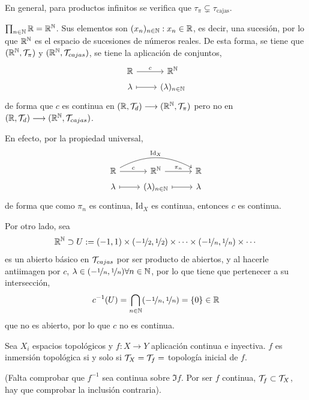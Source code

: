 En general, para productos infinitos se verifica que $\tau_\pi \subsetneq \tau_{\text{cajas}}$.
\begin{custom}
    [Contraejemplo] $\prod_{n \in \mathbb{N}} \mathbb{R} = \mathbb{R}^{\mathbb{N}}$. Sus elementos son $(x_n)_{n \in \mathbb{N}}: x_n \in \mathbb{R}$, es decir, una sucesi\'on, por lo que $\mathbb{R}^{\mathbb{N}}$ es el espacio de sucesiones de n\'umeros reales. De esta forma, se tiene que $(\mathbb{R}^{\mathbb{N}}, \mathcal{T}_{\pi})$ y $(\mathbb{R}^{\mathbb{N}}, \mathcal{T}_{cajas})$, se tiene la aplicaci\'on de conjuntos,
    $$\bt \bb R \rar{c} & \bb R^{\bb N} \\[-5mm] \lambda \rarmaps & (\lambda)_{n\in\bb N}\et$$
     de forma que $c$ es continua en $(\mathbb{R}, \mathcal{T}_d)\longrightarrow (\mathbb{R}^{\mathbb{N}}, \mathcal{T}_{\pi})$ pero no en $(\mathbb{R}, \mathcal{T}_d)\longrightarrow (\mathbb{R}^{\mathbb{N}}, \mathcal{T}_{cajas})$.

     En efecto, por la propiedad universal, 
     $$\bt \bb R \rar{c} \arrow[bend left=10mm]{rr}{\text{Id}_X} & \bb R^{\bb N} \rar{\pi_n} & \bb R \\[-5mm] 
     \lambda \rarmaps & (\lambda)_{n \in \bb N} \rarmaps & \lambda
     \et$$ de forma que como $\pi_n$ es continua, $\text{Id}_X$ es continua, entonces $c$ es continua.

     Por otro lado, sea 
     $$\mathbb{R}^{\mathbb{N}} \supset U := (-1,1) \times (-\nicefrac{1}{2}, \nicefrac{1}{2}) \times \cdots \times (-\nicefrac{1}{n}, \nicefrac{1}{n}) \times \cdots $$
     es un abierto b\'asico en $\mathcal{T}_{cajas}$ por ser producto de abiertos, y al hacerle antiimagen por $c$, $\lambda \in (-\nicefrac{1}{n}, \nicefrac{1}{n})\forall n\in \mathbb{N}$, por lo que tiene que pertenecer a su intersecci\'on,  
     $$c^{-1} (U) = \bigcap_{n \in \mathbb{N}} (-\nicefrac{1}{n}, \nicefrac{1}{n}) = \{0\} \in \mathbb{R}$$
     que no es abierto, por lo que $c$ no es continua.
\end{custom}
\begin{ejer}
    Sea $X_i$ espacios topol\'ogicos y $f:X\longrightarrow Y$ aplicaci\'on continua e inyectiva. $f$ es inmersi\'on topol\'ogica si y solo si $\mathcal{T}_X = \mathcal{T}_f =$ topolog\'ia inicial de $f$. 
    
    (Falta comprobar que $f^{-1}$ sea continua sobre $\Im f$. Por ser $f$ continua, $\mathcal{T}_f \subset \mathcal{T}_X$, hay que comprobar la inclusi\'on contraria). 
\end{ejer}
